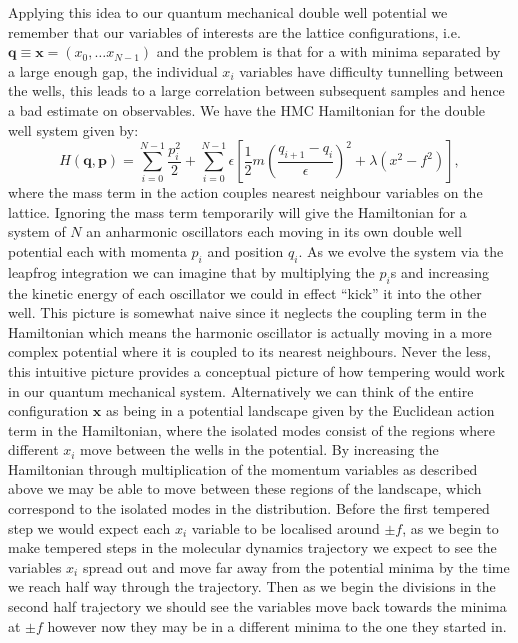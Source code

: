 \documentclass[12pt]{article}
\begin{document}
    Applying this idea to our quantum mechanical double well potential we remember that our variables of interests are the lattice configurations, i.e. $\bm{q}\equiv\bm{x}=\left(x_0,\dots x_{N-1}\right)$ and the problem is that for a with minima separated by a large enough gap, the individual $x_i$ variables have difficulty tunnelling between the wells, this leads to a large correlation between subsequent samples and hence a bad estimate on observables. We have the HMC Hamiltonian for the double well system given by:
    \begin{equation}
        H\left(\bm{q},\bm{p}\right) = \sum_{i=0}^{N-1}\frac{p_i^2}{2} + \sum_{i=0}^{N-1} \epsilon \left[\frac{1}{2}m\left(\frac{q_{i+1}-q_{i}}{\epsilon}\right)^2 + \lambda\left(x^2-f^2\right)\right],
    \end{equation}
    where the mass term in the action couples nearest neighbour variables on the lattice. Ignoring the mass term temporarily will give the Hamiltonian for a system of $N$ an anharmonic oscillators each moving in its own double well potential each with momenta $p_i$ and position $q_i$. As we evolve the system via the leapfrog integration we can imagine that by multiplying the $p_i$s and increasing the kinetic energy of each oscillator we could in effect ``kick'' it into the other well. This picture is somewhat naive since it neglects the coupling term in the Hamiltonian which means the harmonic oscillator is actually moving in a more complex potential where it is coupled to its nearest neighbours. Never the less, this intuitive picture provides a conceptual picture of how tempering would work in our quantum mechanical system. Alternatively we can think of the entire configuration $\bm{x}$ as being in a potential landscape given by the Euclidean action term in the Hamiltonian, where the isolated modes consist of the regions where different $x_i$ move between the wells in the potential. By increasing the Hamiltonian through multiplication of the momentum variables as described above we may be able to move between these regions of the landscape, which correspond to the isolated modes in the distribution. Before the first tempered step we would expect each $x_i$ variable to be localised around $\pm f$, as we begin to make tempered steps in the molecular dynamics trajectory we expect to see the variables $x_i$ spread out and move far away from the potential minima by the time we reach half way through the trajectory. Then as we begin the divisions in the second half trajectory we should see the variables move back towards the minima at $\pm f$ however now they may be in a different minima to the one they started in.
\end{document}

